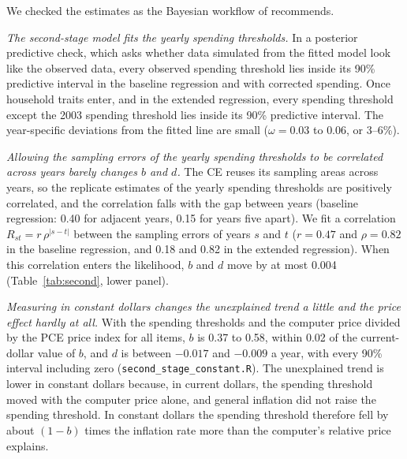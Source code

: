 \documentclass[11pt]{article}
\begin{document}
We checked the estimates as the Bayesian workflow of \citet{gelman2020} recommends.

\emph{The second-stage model fits the yearly spending thresholds.} In a posterior predictive check, which asks whether data simulated from the fitted model look like the observed data, every observed spending threshold lies inside its 90\% predictive interval in the baseline regression and with corrected spending. Once household traits enter, and in the extended regression, every spending threshold except the 2003 spending threshold lies inside its 90\% predictive interval. The year-specific deviations from the fitted line are small ($\omega = 0.03$ to $0.06$, or 3--6\%).

\emph{Allowing the sampling errors of the yearly spending thresholds to be correlated across years barely changes $b$ and $d$.} The CE reuses its sampling areas across years, so the replicate estimates of the yearly spending thresholds are positively correlated, and the correlation falls with the gap between years (baseline regression: 0.40 for adjacent years, 0.15 for years five apart). We fit a correlation $R_{st} = r\,\rho^{|s-t|}$ between the sampling errors of years $s$ and $t$ ($r = 0.47$ and $\rho = 0.82$ in the baseline regression, and 0.18 and 0.82 in the extended regression). When this correlation enters the likelihood, $b$ and $d$ move by at most 0.004 (Table~\ref{tab:second}, lower panel).

\emph{Measuring in constant dollars changes the unexplained trend a little and the price effect hardly at all.} With the spending thresholds and the computer price divided by the PCE price index for all items, $b$ is 0.37 to 0.58, within 0.02 of the current-dollar value of $b$, and $d$ is between $-0.017$ and $-0.009$ a year, with every 90\% interval including zero (\texttt{second\_stage\_constant.R}). The unexplained trend is lower in constant dollars because, in current dollars, the spending threshold moved with the computer price alone, and general inflation did not raise the spending threshold. In constant dollars the spending threshold therefore fell by about $(1 - b)$ times the inflation rate more than the computer's relative price explains.
\end{document}
